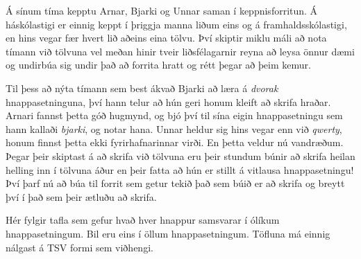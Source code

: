 
Á sínum tíma kepptu Arnar, Bjarki og Unnar saman í keppnisforritun. Á háskólastigi er einnig keppt í þriggja manna
liðum eins og á framhaldsskólastigi, en hins vegar fær hvert lið aðeins eina tölvu. Því skiptir miklu máli að 
nota tímann við tölvuna vel meðan hinir tveir liðsfélagarnir reyna að leysa önnur dæmi og undirbúa sig undir það
að forrita hratt og rétt þegar að þeim kemur.

Til þess að nýta tímann sem best ákvað Bjarki að læra á \emph{dvorak} hnappasetninguna, því hann telur að hún
geri honum kleift að skrifa hraðar. Arnari fannst þetta góð hugmynd, og bjó því til sína eigin hnappasetningu
sem hann kallaði \emph{bjarki}, og notar hana. Unnar heldur sig hins vegar enn við \emph{qwerty}, honum finnst þetta ekki
fyrirhafnarinnar virði. En þetta veldur nú vandræðum. Þegar þeir skiptast á að skrifa við tölvuna eru þeir
stundum búnir að skrifa heilan helling inn í tölvuna áður en þeir fatta að hún er stillt á vitlausa
hnappasetningu! Því þarf nú að búa til forrit sem getur tekið það sem búið er að skrifa og breytt því í
það sem þeir ætluðu að skrifa.

Hér fylgir tafla sem gefur hvað hver hnappur samsvarar í ólíkum hnappasetningum. Bil eru eins í öllum
hnappasetningum. Töfluna má einnig nálgast á TSV formi sem viðhengi.


